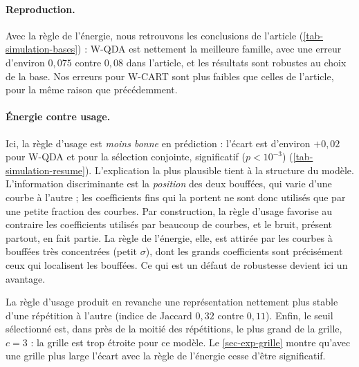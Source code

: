 \begin{table}[ht]
\centering
\small

\caption{Données simulées : erreur de test moyenne sur $100$ répétitions. La ligne « Article » reprend le tableau~3 de \citet{berlinet2008functional}.}
\label{tab-simulation-bases}
\end{table}

\begin{table}[ht]
\centering
\small

\caption{Données simulées, base \texttt{db4}. Mêmes colonnes que le \cref{tab-phoneme-resume}.}
\label{tab-simulation-resume}
\end{table}

\paragraph{Reproduction.} Avec la règle de l'énergie, nous retrouvons les conclusions de l'article (\cref{tab-simulation-bases}) : W-QDA est nettement la meilleure famille, avec une erreur d'environ $0{,}075$ contre $0{,}08$ dans l'article, et les résultats sont robustes au choix de la base. Nos erreurs pour W-CART sont plus faibles que celles de l'article, pour la même raison que précédemment.

\paragraph{Énergie contre usage.} Ici, la règle d'usage est \emph{moins bonne} en prédiction : l'écart est d'environ $+0{,}02$ pour W-QDA et pour la sélection conjointe, significatif ($p<10^{-3}$) (\cref{tab-simulation-resume}). L'explication la plus plausible tient à la structure du modèle. L'information discriminante est la \emph{position} des deux bouffées, qui varie d'une courbe à l'autre ; les coefficients fins qui la portent ne sont donc utilisés que par une petite fraction des courbes. Par construction, la règle d'usage favorise au contraire les coefficients utilisés par beaucoup de courbes, et le bruit, présent partout, en fait partie. La règle de l'énergie, elle, est attirée par les courbes à bouffées très concentrées (petit $\sigma$), dont les grands coefficients sont précisément ceux qui localisent les bouffées. Ce qui est un défaut de robustesse devient ici un avantage.

La règle d'usage produit en revanche une représentation nettement plus stable d'une répétition à l'autre (indice de Jaccard $0{,}32$ contre $0{,}11$). Enfin, le seuil sélectionné est, dans près de la moitié des répétitions, le plus grand de la grille, $c=3$ : la grille est trop étroite pour ce modèle. Le \cref{sec-exp-grille} montre qu'avec une grille plus large l'écart avec la règle de l'énergie cesse d'être significatif.

